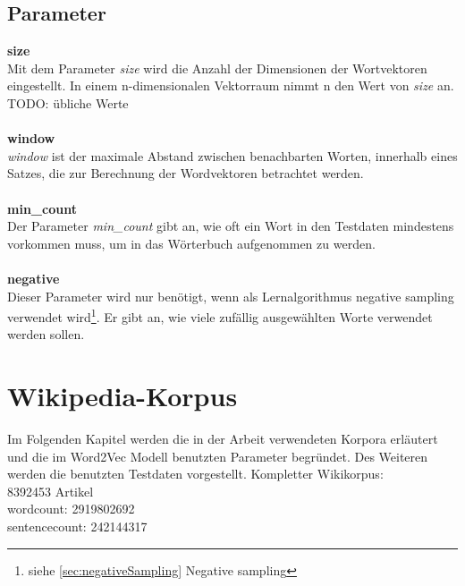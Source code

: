\documentclass[12pt,a4paper]{report}
\begin{document}
	\section{Parameter}
	\label{sec:Parameter}
	\textbf{size}
	\vspace{1em}\\
	Mit dem Parameter \textit{size} wird die Anzahl der Dimensionen der Wortvektoren eingestellt. In einem n-dimensionalen Vektorraum nimmt n den Wert von \textit{size} an.
	TODO: übliche Werte\\	
	\vspace{1em}\\
	\textbf{window}
	\vspace{1em}\\
	\textit{window} ist der maximale Abstand zwischen benachbarten Worten, innerhalb eines Satzes, die zur Berechnung der Wordvektoren betrachtet werden.\\
	\vspace{1em}\\
	\textbf{min\_count}
	\vspace{1em}\\
	Der Parameter \textit{min\_count} gibt an, wie oft ein Wort in den Testdaten mindestens vorkommen muss, um in das Wörterbuch aufgenommen zu werden.\\
	\vspace{1em}\\
	\textbf{negative}
	\vspace{1em}\\
	Dieser Parameter wird nur benötigt, wenn als Lernalgorithmus negative sampling verwendet wird\footnote{siehe \ref{sec:negativeSampling} Negative sampling}. Er gibt an, wie viele zufällig ausgewählten Worte verwendet werden sollen.
	
	

	
	
\newpage
\chapter{Wikipedia-Korpus}
Im Folgenden Kapitel werden die in der Arbeit verwendeten Korpora erläutert und die im Word2Vec Modell benutzten Parameter begründet. Des Weiteren werden die benutzten Testdaten vorgestellt.
\iffalse
	Kompletter Wikikorpus: \\
	8392453 Artikel\\
	wordcount: 2919802692\\
	sentencecount: 242144317\\
	
\end{document}
